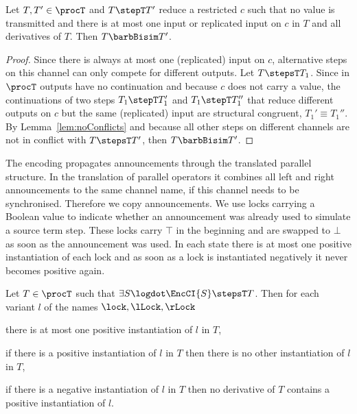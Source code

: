 \documentclass[]{eptcs}
\begin{document}
\begin{prop}
	Let $ T, T' \in \procT $ and $ T \stepT T' $ reduce a restricted $ c $ such that no value is transmitted and there is at most one input or replicated input on $ c $ in $ T $ and all derivatives of $ T $.
	Then $ T \barbBisim T' $.
	\label{prop:auxStepsReq}
\end{prop}

\begin{proof}
	Since there is always at most one (replicated) input on $ c $, alternative steps on this channel can only compete for different outputs. Let $ T \stepsT T_1 $. Since in $ \procT $ outputs have no continuation and because $ c $ does not carry a value, the continuations of two steps $ T_1 \stepT T_1' $ and $ T_1 \stepT T_1'' $ that reduce different outputs on $ c $ but the same (replicated) input are structural congruent, \ie $ T_1' \equiv T_1'' $.
	By Lemma~\ref{lem:noConflicts} and because all other steps on different channels are not in conflict with $ T \stepsT T' $, then $ T \barbBisim T' $.
\end{proof}

The encoding propagates announcements through the translated parallel structure. In the translation of parallel operators it combines all left and right announcements \wrt to the same channel name, if this channel needs to be synchronised. Therefore we copy announcements.
We use locks carrying a Boolean value to indicate whether an announcement was already used to simulate a source term step. These locks carry $ \top $ in the beginning and are swapped to $ \bot $ as soon as the announcement was used. In each state there is at most one positive instantiation of each lock and as soon as a lock is instantiated negatively it never becomes positive again.

\begin{lemma}
	Let $ T \in \procT $ such that $ \exists S\logdot \EncCI{S} \stepsT T $. Then for each variant $ l $ of the names $ \lock, \lLock, \rLock $
	\begin{compactenum}
		\item there is at most one positive instantiation of $ l $ in $ T $,
		\item if there is a positive instantiation of $ l $ in $ T $ then there is no other instantiation of $ l $ in $ T $,
		\item if there is a negative instantiation of $ l $ in $ T $ then no derivative of $ T $ contains a positive instantiation of $ l $.
	\end{compactenum}
	\label{lem:sumLocks}
\end{lemma}
\end{document}
